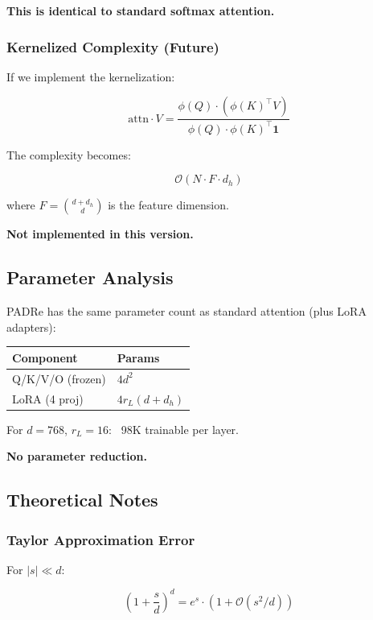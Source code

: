 \textbf{This is identical to standard softmax attention.}

\subsubsection{Kernelized Complexity (Future)}

If we implement the kernelization:

\[
\text{attn} \cdot V = \frac{\phi(Q) \cdot (\phi(K)^\top V)}{\phi(Q) \cdot \phi(K)^\top \mathbf{1}}
\tag{4.13}
\]

The complexity becomes:

\[
\mathcal{O}(N \cdot F \cdot d_h)
\tag{4.14}
\]

where $F = \binom{d + d_h}{d}$ is the feature dimension.

\textbf{Not implemented in this version.}

\subsection{Parameter Analysis}

PADRe has the same parameter count as standard attention (plus LoRA adapters):

\begin{table}[H]
\centering
\small
\begin{tabular}{ll}
\toprule
\textbf{Component} & \textbf{Params} \\
\midrule
Q/K/V/O (frozen) & $4 d^2$ \\
LoRA (4 proj) & $4 r_L (d + d_h)$ \\
\bottomrule
\end{tabular}
\end{table}

For $d = 768$, $r_L = 16$: ~98K trainable per layer.

\textbf{No parameter reduction.}

\subsection{Theoretical Notes}

\subsubsection{Taylor Approximation Error}

For $|s| \ll d$:

\[
\left(1 + \frac{s}{d}\right)^d = e^s \cdot (1 + \mathcal{O}(s^2/d))
\tag{4.15}
\]

